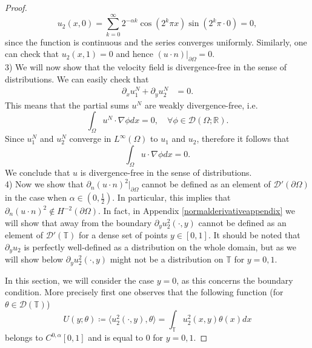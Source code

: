 \documentclass[12pt,a4paper]{article}
\theoremstyle{definition}
\theoremstyle{remark}
\numberwithin{equation}{section}
\begin{document}
\begin{proof}
\begin{equation*}
u_2 (x,0) = \sum_{k=0}^\infty 2^{-\alpha k} \cos (2^k \pi x) \sin (2^k \pi \cdot 0) = 0,
\end{equation*}
since the function is continuous and the series converges uniformly. Similarly, one can check that $u_2 (x,1) = 0$ and hence $(u \cdot n)\lvert_{\partial \Omega} = 0$.\\
3) We will now show that the velocity field is divergence-free in the sense of distributions. We can easily check that
\begin{align*}
\partial_x u^N_1 + \partial_y u^N_2 &= 0.
\end{align*}
This means that the partial sums $u^N$ are weakly divergence-free, i.e.
\begin{equation*}
\int_{\Omega} u^N \cdot \nabla \phi dx = 0, \quad \forall \phi \in \mathcal{D} (  \Omega ; \mathbb{R}).
\end{equation*}
Since $u^N_1$ and $u^N_2$ converge in $L^\infty (\Omega)$ to $u_1 $ and $u_2$, therefore it follows that
\begin{equation*}
\int_\Omega u \cdot \nabla \phi dx=0.
\end{equation*}
We conclude that $u$ is divergence-free in the sense of distributions. \\
4) 
Now we show that $\partial_n (u \cdot n)^2 \lvert_{\partial \Omega}$ cannot be defined as an element of $\mathcal{D}' (\partial \Omega)$ in the case when $\alpha \in \left(0,\frac{1}{2} \right)$. In particular, this implies that $\partial_n (u \cdot n)^2 \notin H^{-2} (\partial \Omega)$. In fact, in Appendix \ref{normalderivativeappendix} we will show that away from the boundary $\partial_y u_2^2 (\cdot, y)$ cannot be defined as an element of $\mathcal{D}' (\mathbb{T})$ for a dense set of points $y \in [0,1]$. It should be noted that $\partial_y u_2 $ is perfectly well-defined as a distribution on the whole domain, but as we will show below $\partial_y u_2^2 (\cdot, y)$ might not be a distribution on $\mathbb{T}$ for $y = 0,1$.

In this section, we will consider the case $y=0$, as this concerns the boundary condition. More precisely first one observes that the following function (for $\theta \in \mathcal{D} (\mathbb{T})$)
\begin{equation}
U(y; \theta) \coloneqq \langle  u_2^2 (\cdot,y),  \theta \rangle = \int_{\mathbb{T}} u_2^2 (x,y) \theta (x)dx
\end{equation}
belongs to $C^{0,\alpha} [0,1]$ and is equal to $0$ for $y=0,1$. 


\end{proof}
\end{document}
